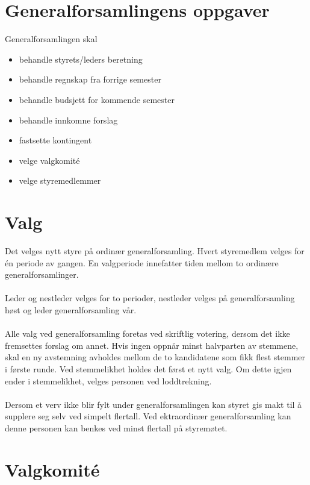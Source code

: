 \documentclass[12pt,a4paper,norsk]{article}
\begin{document}
\section{Generalforsamlingens oppgaver}

Generalforsamlingen skal

\begin{itemize}
    \item behandle styrets/leders beretning
    \item behandle regnskap fra forrige semester
    \item behandle budsjett for kommende semester
    \item behandle innkomne forslag
    \item fastsette kontingent
    \item velge valgkomité
    \item velge styremedlemmer
\end{itemize}



\section{Valg}

Det velges nytt styre på ordinær generalforsamling. Hvert styremedlem velges for én periode av gangen.
En valgperiode innefatter tiden mellom to ordinære generalforsamlinger.
\\
\\
Leder og nestleder velges for to perioder, nestleder velges på 
generalforsamling høst og leder generalforsamling vår.
\\
\\
Alle valg ved generalforsamling foretas ved skriftlig votering, dersom det ikke fremsettes forslag
om annet. Hvis ingen oppnår minst halvparten av stemmene, skal en ny avstemning avholdes
mellom de to kandidatene som fikk flest stemmer i første runde. Ved stemmelikhet holdes det
først et nytt valg. Om dette igjen ender i stemmelikhet, velges personen ved loddtrekning.
\\
\\
Dersom et verv ikke blir fylt under generalforsamlingen kan styret gis makt til å supplere 
seg selv ved simpelt flertall. Ved ektraordinær generalforsamling kan denne personen kan benkes ved minst  flertall på styremøtet.



\section{Valgkomité}
\end{document}
